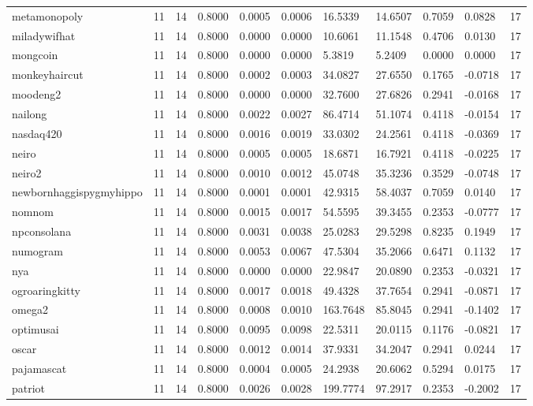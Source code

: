 \begin{table}[htbp]
\begin{tabular}{lllllllllll}
metamonopoly & 11 & 14 & 0.8000 & 0.0005 & 0.0006 & 16.5339 & 14.6507 & 0.7059 & 0.0828 & 17 \\
miladywifhat & 11 & 14 & 0.8000 & 0.0000 & 0.0000 & 10.6061 & 11.1548 & 0.4706 & 0.0130 & 17 \\
mongcoin & 11 & 14 & 0.8000 & 0.0000 & 0.0000 & 5.3819 & 5.2409 & 0.0000 & 0.0000 & 17 \\
monkeyhaircut & 11 & 14 & 0.8000 & 0.0002 & 0.0003 & 34.0827 & 27.6550 & 0.1765 & -0.0718 & 17 \\
moodeng2 & 11 & 14 & 0.8000 & 0.0000 & 0.0000 & 32.7600 & 27.6826 & 0.2941 & -0.0168 & 17 \\
nailong & 11 & 14 & 0.8000 & 0.0022 & 0.0027 & 86.4714 & 51.1074 & 0.4118 & -0.0154 & 17 \\
nasdaq420 & 11 & 14 & 0.8000 & 0.0016 & 0.0019 & 33.0302 & 24.2561 & 0.4118 & -0.0369 & 17 \\
neiro & 11 & 14 & 0.8000 & 0.0005 & 0.0005 & 18.6871 & 16.7921 & 0.4118 & -0.0225 & 17 \\
neiro2 & 11 & 14 & 0.8000 & 0.0010 & 0.0012 & 45.0748 & 35.3236 & 0.3529 & -0.0748 & 17 \\
newbornhaggispygmyhippo & 11 & 14 & 0.8000 & 0.0001 & 0.0001 & 42.9315 & 58.4037 & 0.7059 & 0.0140 & 17 \\
nomnom & 11 & 14 & 0.8000 & 0.0015 & 0.0017 & 54.5595 & 39.3455 & 0.2353 & -0.0777 & 17 \\
npconsolana & 11 & 14 & 0.8000 & 0.0031 & 0.0038 & 25.0283 & 29.5298 & 0.8235 & 0.1949 & 17 \\
numogram & 11 & 14 & 0.8000 & 0.0053 & 0.0067 & 47.5304 & 35.2066 & 0.6471 & 0.1132 & 17 \\
nya & 11 & 14 & 0.8000 & 0.0000 & 0.0000 & 22.9847 & 20.0890 & 0.2353 & -0.0321 & 17 \\
ogroaringkitty & 11 & 14 & 0.8000 & 0.0017 & 0.0018 & 49.4328 & 37.7654 & 0.2941 & -0.0871 & 17 \\
omega2 & 11 & 14 & 0.8000 & 0.0008 & 0.0010 & 163.7648 & 85.8045 & 0.2941 & -0.1402 & 17 \\
optimusai & 11 & 14 & 0.8000 & 0.0095 & 0.0098 & 22.5311 & 20.0115 & 0.1176 & -0.0821 & 17 \\
oscar & 11 & 14 & 0.8000 & 0.0012 & 0.0014 & 37.9331 & 34.2047 & 0.2941 & 0.0244 & 17 \\
pajamascat & 11 & 14 & 0.8000 & 0.0004 & 0.0005 & 24.2938 & 20.6062 & 0.5294 & 0.0175 & 17 \\
patriot & 11 & 14 & 0.8000 & 0.0026 & 0.0028 & 199.7774 & 97.2917 & 0.2353 & -0.2002 & 17 \\

\end{tabular}
\end{table}
